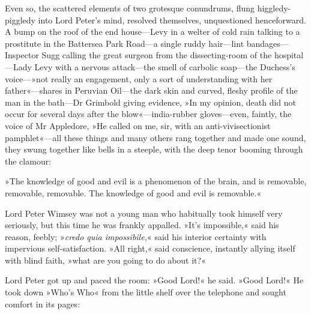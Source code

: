 Even so, the scattered elements of two grotesque conundrums, flung higgledy-piggledy into Lord Peter's mind, resolved themselves, unquestioned henceforward. A bump on the roof of the end house\allowbreak---\allowbreak Levy in a welter of cold rain talking to a prostitute in the Battersea Park Road\allowbreak---\allowbreak a single ruddy hair\allowbreak---\allowbreak lint bandages\allowbreak---\allowbreak Inspector Sugg calling the great surgeon from the dissecting-room of the hospital\allowbreak---\allowbreak Lady Levy with a nervous attack\allowbreak---\allowbreak the smell of carbolic soap\allowbreak---\allowbreak the Duchess's voice---»not really an engagement, only a sort of understanding with her father«---shares in Peruvian Oil\allowbreak---\allowbreak the dark skin and curved, fleshy profile of the man in the bath\allowbreak---\allowbreak Dr Grimbold giving evidence, »In my opinion, death did not occur for several days after the blow«---india-rubber gloves\allowbreak---\allowbreak even, faintly, the voice of Mr Appledore, »He called on me, sir, with an anti-vivisectionist pamphlet«---all these things and many others rang together and made one sound, they swung together like bells in a steeple, with the deep tenor booming through the clamour:

»The knowledge of good and evil is a phenomenon of the brain, and is removable, removable, removable. The knowledge of good and evil is removable.«

Lord Peter Wimsey was not a young man who habitually took himself very seriously, but this time he was frankly appalled. »It's impossible,« said his reason, feebly; »\textit{credo quia impossibile,}« said his interior certainty with impervious self-satisfaction. »All right,« said conscience, instantly allying itself with blind faith, »what are you going to do about it?«

Lord Peter got up and paced the room: »Good Lord!« he said. »Good Lord!« He took down »Who's Who« from the little shelf over the telephone and sought comfort in its pages:

